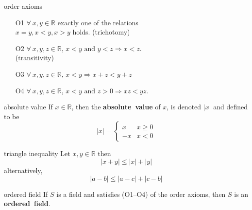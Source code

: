 \documentclass[avery5371,grid]{flashcards}
\newcommand{\R}{\mathbb{R}}
\begin{document}
\begin{flashcard}[Axiom]{order axioms}
\begin{enumerate}
\item[O1] $\forall \ x,y \in \R$ exactly one of the relations \\
$x=y, x<y, x>y$ holds. (trichotomy)
\item[O2] $\forall \ x,y,z \in \R$, $x<y \textrm{ and } y<z 
\Rightarrow x<z$. \\(transitivity)
\item[O3] $\forall \ x,y,z \in \R$, $x<y \Rightarrow x+z<y+z$
\item[O4] $\forall \ x,y,z \in \R$, $x<y \textrm{ and } z>0 
\Rightarrow xz<yz$.
\end{enumerate}
\end{flashcard}

\begin{flashcard}[Definition]{absolute value}
If $x \in \R$, then the \mbox{\textbf{absolute value}} of $x$,
is denoted $|x|$ and defined to be
\begin{equation*}
|x| = \left\{ \begin{array}{rl}
   x & x \geq 0 \\
  -x & x < 0
\end{array} \right.
\end{equation*} 
\end{flashcard}

\begin{flashcard}[Theorem]{triangle inequality}
Let $x,y \in \R$ then
\begin{equation*}
|x+y| \leq |x| + |y|
\end{equation*}
alternatively,
\begin{equation*}
|a-b| \leq |a-c| + |c-b|
\end{equation*}
\end{flashcard}

\begin{flashcard}[Definition]{ordered field}
If $S$ is a field and satisfies (O1--O4) of the order axioms,
then $S$ is an \mbox{\textbf{ordered field}}.
\end{flashcard}
\end{document}
